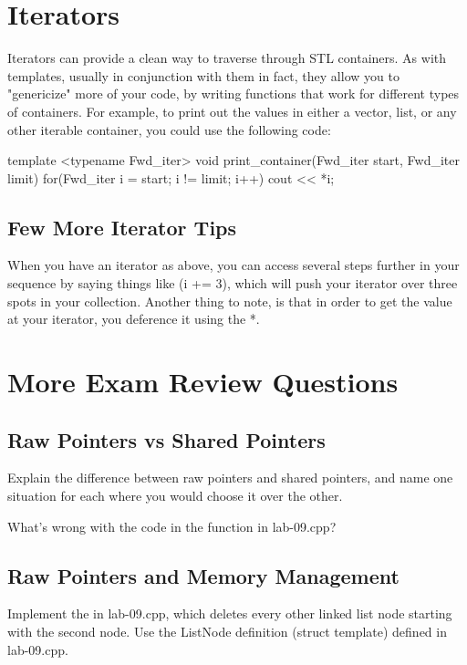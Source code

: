 \documentclass{tufte-handout}
\begin{document}
\section{Iterators}
Iterators can provide a clean way to traverse through STL containers. 
As with templates, usually in conjunction with them in fact, they allow you to "genericize" more of your code, by writing functions that work for different types of containers.
For example, to print out the values in either a vector, list, or any other iterable container, you could use the following code:

\begin{Code}
template <typename Fwd_iter>
void print_container(Fwd_iter start, Fwd_iter limit) {
    for(Fwd_iter i = start; i != limit; i++) {
        cout << *i;
    }    
}
\end{Code}


\subsection{Few More Iterator Tips}
When you have an iterator as above, you can access several steps further in your sequence by saying things like (i += 3), which will push your iterator over three spots in your collection.
Another thing to note, is that in order to get the value at your iterator, you deference it using the *.  


\section{More Exam Review Questions}

\subsection{Raw Pointers vs Shared Pointers}
Explain the difference between raw pointers and shared pointers, and name one situation for each where you would choose it over the other.

What's wrong with the code in the  function in lab-09.cpp?

\subsection{Raw Pointers and Memory Management}
Implement the  in lab-09.cpp, which deletes every other linked list node starting with the second node. Use the ListNode definition (struct template) defined in lab-09.cpp.
\end{document}
